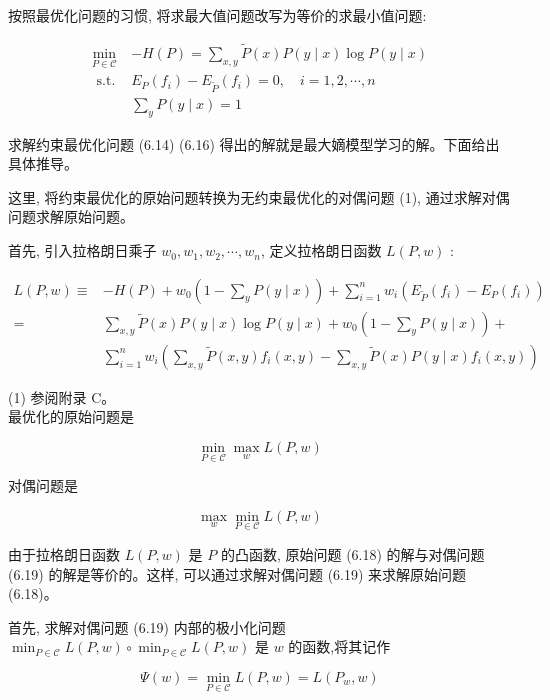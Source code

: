 \documentclass[10pt]{article}
\begin{document}
\begin{CJK*}{UTF8}{bsmi}
按照最优化问题的习惯, 将求最大值问题改写为等价的求最小值问题:

\[
\begin{array}{ll}
\min _{P \in \mathcal{C}} & -H(P)=\sum_{x, y} \tilde{P}(x) P(y \mid x) \log P(y \mid x) \\
\text { s.t. } & E_{P}\left(f_{i}\right)-E_{\tilde{P}}\left(f_{i}\right)=0, \quad i=1,2, \cdots, n \\
& \sum_{y} P(y \mid x)=1 \tag{6.16}
\end{array}
\]

求解约束最优化问题 (6.14) (6.16) 得出的解就是最大嫡模型学习的解。下面给出具体推导。

这里, 将约束最优化的原始问题转换为无约束最优化的对偶问题 (1), 通过求解对偶问题求解原始问题。

首先, 引入拉格朗日乘子 $w_{0}, w_{1}, w_{2}, \cdots, w_{n}$, 定义拉格朗日函数 $L(P, w)$ :


\begin{align*}
L(P, w) \equiv & -H(P)+w_{0}\left(1-\sum_{y} P(y \mid x)\right)+\sum_{i=1}^{n} w_{i}\left(E_{\tilde{P}}\left(f_{i}\right)-E_{P}\left(f_{i}\right)\right) \\
= & \sum_{x, y} \tilde{P}(x) P(y \mid x) \log P(y \mid x)+w_{0}\left(1-\sum_{y} P(y \mid x)\right)+ \\
& \sum_{i=1}^{n} w_{i}\left(\sum_{x, y} \tilde{P}(x, y) f_{i}(x, y)-\sum_{x, y} \tilde{P}(x) P(y \mid x) f_{i}(x, y)\right) \tag{6.17}
\end{align*}


(1) 参阅附录 C。\\
最优化的原始问题是


\begin{equation*}
\min _{P \in \mathcal{C}} \max _{w} L(P, w) \tag{6.18}
\end{equation*}


对偶问题是


\begin{equation*}
\max _{w} \min _{P \in \mathcal{C}} L(P, w) \tag{6.19}
\end{equation*}


由于拉格朗日函数 $L(P, w)$ 是 $P$ 的凸函数, 原始问题 (6.18) 的解与对偶问题 (6.19) 的解是等价的。这样, 可以通过求解对偶问题 (6.19) 来求解原始问题 (6.18)。

首先, 求解对偶问题 (6.19) 内部的极小化问题 $\min _{P \in \mathcal{C}} L(P, w) \circ \min _{P \in \mathcal{C}} L(P, w)$ 是 $w$ 的函数,将其记作


\begin{equation*}
\Psi(w)=\min _{P \in \mathcal{C}} L(P, w)=L\left(P_{w}, w\right) \tag{6.20}
\end{equation*}



\end{CJK*}
\end{document}
